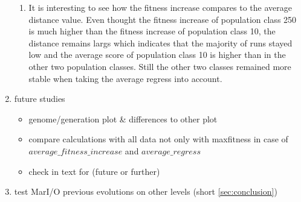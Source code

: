 \begin{enumerate}
\begin{enumerate}
		\item It is interesting to see how the fitness increase compares to the average distance value. Even thought the fitness increase of population class 250 is much higher than the fitness increase of population class 10, the distance remains largs which indicates that the majority of runs stayed low and the average score of population class 10 is higher than in the other two population classes. Still the other two classes remained more stable when taking the average regress into account.
	\end{enumerate}
	\item future studies
	\begin{itemize}
		\item genome/generation plot \& differences to other plot
		\item compare calculations with all data not only with maxfitness in case of $average\_fitness\_increase$ and $average\_regress$
		\item check in text for (future or further)
	\end{itemize}
	\item test MarI/O previous evolutions on other levels (short \ref{sec:conclusion})
\end{enumerate}
